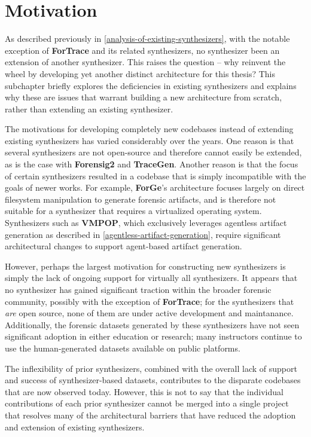 \section{Motivation}\label{motivation}

As described previously in \autoref{analysis-of-existing-synthesizers}, with the notable exception of
\textbf{ForTrace} and its related synthesizers, no synthesizer been an
extension of another synthesizer. This raises the question -- why
reinvent the wheel by developing yet another distinct architecture for
this thesis? This subchapter briefly explores the deficiencies in
existing synthesizers and explains why these are issues that warrant
building a new architecture from scratch, rather than extending an
existing synthesizer.

The motivations for developing completely new codebases instead of
extending existing synthesizers has varied considerably over the years.
One reason is that several synthesizers are not open-source and
therefore cannot easily be extended, as is the case with
\textbf{Forensig2} and \textbf{TraceGen}. Another reason is that the
focus of certain synthesizers resulted in a codebase that is simply
incompatible with the goals of newer works. For example,
\textbf{ForGe}'s architecture focuses largely on direct filesystem
manipulation to generate forensic artifacts, and is therefore not
suitable for a synthesizer that requires a virtualized operating system.
Synthesizers such as \textbf{VMPOP}, which exclusively leverages
agentless artifact generation as described in \autoref{agentless-artifact-generation}, require significant
architectural changes to support agent-based artifact generation.

However, perhaps the largest motivation for constructing new
synthesizers is simply the lack of ongoing support for virtually all
synthesizers. It appears that no synthesizer has gained significant
traction within the broader forensic community, possibly with the
exception of \textbf{ForTrace}; for the synthesizers that \emph{are}
open source, none of them are under active development and maintanance.
Additionally, the forensic datasets generated by these synthesizers have
not seen significant adoption in either education or research; many
instructors continue to use the human-generated datasets available on
public platforms.

The inflexibility of prior synthesizers, combined with the overall lack
of support and success of synthesizer-based datasets, contributes to the
disparate codebases that are now observed today. However, this is not to
say that the individual contributions of each prior synthesizer cannot
be merged into a single project that resolves many of the architectural
barriers that have reduced the adoption and extension of existing
synthesizers.

